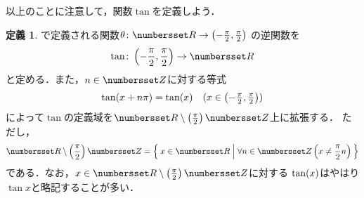 \documentclass[11pt,a4paper]{ltjsarticle}
\newcommand*{\maparrow}{\rightarrow}
\theoremstyle{definition}
\newtheorem{dfn}{定義}[section]
\begin{document}
以上のことに注意して，関数$\tan$を定義しよう．


\begin{dfn} \label{dfn:tan}
  で定義される関数$\theta \colon \Real \maparrow \interval{op}{- \frac{\pi}{2}, \frac{\pi}{2}}$
  の逆関数を
  \begin{align}
    \tan \colon \interval{op}{- \frac{\pi}{2}, \frac{\pi}{2}} \maparrow \Real
    \label{eq:tan}
  \end{align}
  と定める．また，$n \in \Zahlen$に対する等式
  \begin{align}
    \apply{\tan}{x + n \pi} = \apply{\tan}{x} \quad \text{($\textstyle x \in \interval{op}{- \frac{\pi}{2}, \frac{\pi}{2}}$)}
    \label{eq:tanperiod}
  \end{align}
  によって$\tan$の定義域を$\Real \setminus \paren{\frac{\pi}{2}}\Zahlen$上に拡張する．
  ただし，
  \begin{align}
    \Real \setminus \paren{\frac{\pi}{2}} \Zahlen
    = \setintension{x \in \Real}{\forall n \in \Zahlen \paren{x \neq \frac{\pi}{2} n}}
    \label{eq:tandomain}
  \end{align}
  である．なお，$x \in \Real \setminus \paren{\frac{\pi}{2}} \Zahlen$に対する
  $\apply{\tan}{x}$はやはり$\tan x$と略記することが多い．
\end{dfn}
\end{document}
